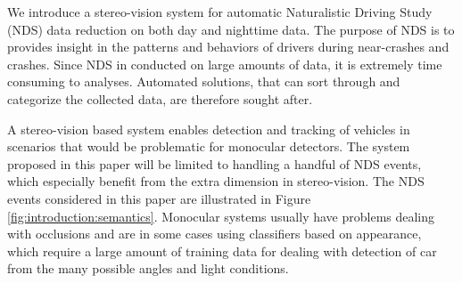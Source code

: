 
We introduce a stereo-vision system for automatic Naturalistic Driving Study (NDS) data reduction on both day and nighttime data. The purpose of NDS is to provides insight in the patterns and behaviors of drivers during near-crashes and crashes. Since NDS in conducted on large amounts of data, it is extremely time consuming to analyses. Automated solutions, that can sort through and categorize the collected data, are therefore sought after.

A stereo-vision based system enables detection and tracking of vehicles in scenarios that would be problematic for monocular detectors. The system proposed in this paper will be limited to handling a handful of NDS events, which especially benefit from the extra dimension in stereo-vision. The NDS events considered in this paper are illustrated in Figure \ref{fig:introduction:semantics}. Monocular systems usually have problems dealing with occlusions and are in some cases using classifiers based on appearance, which require a large amount of training data for dealing with detection of car from the many possible angles and light conditions. 

